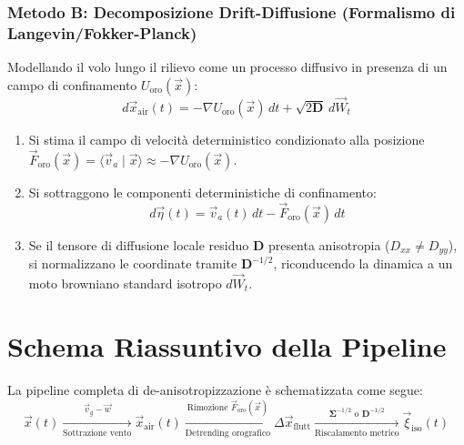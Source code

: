 \documentclass[11pt,a4paper]{article}
\begin{document}
\subsubsection{Metodo B: Decomposizione Drift-Diffusione (Formalismo di Langevin/Fokker-Planck)}
Modellando il volo lungo il rilievo come un processo diffusivo in presenza di un campo di confinamento $U_{\text{oro}}(\vec{x})$:
\begin{equation}
    d\vec{x}_{\text{air}}(t) = -\nabla U_{\text{oro}}(\vec{x})\,dt + \sqrt{2 \mathbf{D}}\,d\vec{W}_t
\end{equation}
\begin{enumerate}
    \item Si stima il campo di velocit\`a deterministico condizionato alla posizione $\vec{F}_{\text{oro}}(\vec{x}) = \langle \vec{v}_a \mid \vec{x} \rangle \approx -\nabla U_{\text{oro}}(\vec{x})$.
    \item Si sottraggono le componenti deterministiche di confinamento:
    \begin{equation}
        d\vec{\eta}(t) = \vec{v}_a(t)\,dt - \vec{F}_{\text{oro}}(\vec{x})\,dt
    \end{equation}
    \item Se il tensore di diffusione locale residuo $\mathbf{D}$ presenta anisotropia ($D_{xx} \neq D_{yy}$), si normalizzano le coordinate tramite $\mathbf{D}^{-1/2}$, riconducendo la dinamica a un moto browniano standard isotropo $d\vec{W}_t$.
\end{enumerate}

\section{Schema Riassuntivo della Pipeline}

La pipeline completa di de-anisotropizzazione \`e schematizzata come segue:
\begin{equation*}
    \vec{x}(t) \xrightarrow[\text{Sottrazione vento}]{\vec{v}_g - \vec{w}} \vec{x}_{\text{air}}(t) \xrightarrow[\text{Detrending orografico}]{\text{Rimozione } \vec{F}_{\text{oro}}(\vec{x})} \Delta \vec{x}_{\text{flutt}} \xrightarrow[\text{Riscalamento metrico}]{\mathbf{\Sigma}^{-1/2} \text{ o } \mathbf{D}^{-1/2}} \vec{\xi}_{\text{iso}}(t)
\end{equation*}
\end{document}
